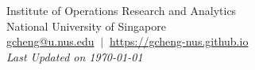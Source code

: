 \documentclass[12pt, a4paper]{article}
\begin{document}




{\par {} \par}
\centering
\footnotesize{Institute of Operations Research and Analytics} \\
\footnotesize{National University of Singapore} \\
\footnotesize{\href{mailto:gcheng@u.nus.edu}{gcheng@u.nus.edu}} $\ \vert \ $ \footnotesize{\href{https://gcheng-nus.github.io}{https://gcheng-nus.github.io}} \\
\vspace*{0.5em}
\footnotesize{\textit{Last Updated on \monthyeardate\today}}

\vspace*{1em}
\end{document}
